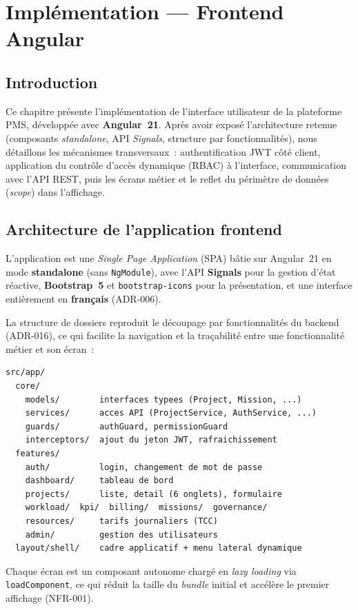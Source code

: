 \chapter{Implémentation --- Frontend Angular}

\section*{Introduction}
Ce chapitre présente l'implémentation de l'interface utilisateur de la plateforme PMS, développée
avec \textbf{Angular~21}. Après avoir exposé l'architecture retenue (composants \emph{standalone},
API \emph{Signals}, structure par fonctionnalités), nous détaillons les mécanismes transversaux~:
authentification JWT côté client, application du contrôle d'accès dynamique (RBAC) à l'interface,
communication avec l'API REST, puis les écrans métier et le reflet du périmètre de données
(\emph{scope}) dans l'affichage.

\section{Architecture de l'application frontend}

L'application est une \emph{Single Page Application} (SPA) bâtie sur Angular~21 en mode
\textbf{standalone} (sans \texttt{NgModule}), avec l'API \textbf{Signals} pour la gestion d'état
réactive, \textbf{Bootstrap~5} et \texttt{bootstrap-icons} pour la présentation, et une interface
entièrement en \textbf{français} (ADR-006).

La structure de dossiers reproduit le découpage par fonctionnalités du backend (ADR-016), ce qui
facilite la navigation et la traçabilité entre une fonctionnalité métier et son écran~:

\begin{verbatim}
src/app/
  core/
    models/        interfaces typees (Project, Mission, ...)
    services/      acces API (ProjectService, AuthService, ...)
    guards/        authGuard, permissionGuard
    interceptors/  ajout du jeton JWT, rafraichissement
  features/
    auth/          login, changement de mot de passe
    dashboard/     tableau de bord
    projects/      liste, detail (6 onglets), formulaire
    workload/  kpi/  billing/  missions/  governance/
    resources/     tarifs journaliers (TCC)
    admin/         gestion des utilisateurs
  layout/shell/    cadre applicatif + menu lateral dynamique
\end{verbatim}

\noindent Chaque écran est un composant autonome chargé en \emph{lazy loading} via
\texttt{loadComponent}, ce qui réduit la taille du \emph{bundle} initial et accélère le premier
affichage (NFR-001).

